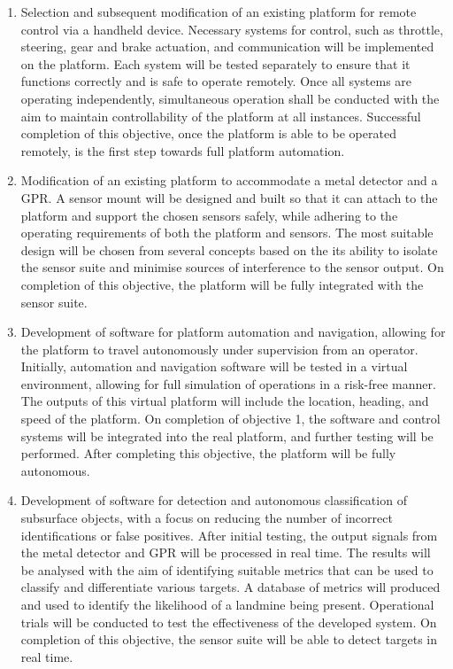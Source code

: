 \documentclass[main.tex]{subfiles}
\begin{document}
\begin{enumerate}
\item Selection and subsequent modification of an existing platform for remote control via a handheld device. Necessary systems for control, such as throttle, steering, gear and brake actuation, and communication will be implemented on the platform. Each system will be tested separately to ensure that it functions correctly and is safe to operate remotely. Once all systems are operating independently, simultaneous operation shall be conducted with the aim to maintain controllability of the platform at all instances. Successful completion of this objective, once the platform is able to be operated remotely, is the first step towards full platform automation.  

\item Modification of an existing platform to accommodate a metal detector and a GPR. A sensor mount will be designed and built so that it can attach to the platform and support the chosen sensors safely, while adhering to the operating requirements of both the platform and sensors. The most suitable design will be chosen from several concepts based on the its ability to isolate the sensor suite and minimise sources of interference to the sensor output. On completion of this objective, the platform will be fully integrated with the sensor suite.

\item Development of software for platform automation and navigation, allowing for the platform to travel autonomously under supervision from an operator. Initially, automation and navigation software will be tested in a virtual environment, allowing for full simulation of operations in a risk-free manner. The outputs of this virtual platform will include the location, heading, and speed of the platform. On completion of objective 1,  the software and control systems will be integrated into the real platform, and further testing will be performed. After completing this objective, the platform will be fully autonomous.

\item Development of software for detection and autonomous classification of subsurface objects, with a focus on reducing the number of incorrect identifications or false positives. After initial testing, the output signals from the metal detector and GPR will be processed in real time. The results will be analysed with the aim of identifying suitable metrics that can be used to classify and differentiate various targets. A database of metrics will produced and used to identify the likelihood of a landmine being present. Operational trials will be conducted to test the effectiveness of the developed system. On completion of this objective, the sensor suite will be able to detect targets in real time.


\end{enumerate}
\end{document}
